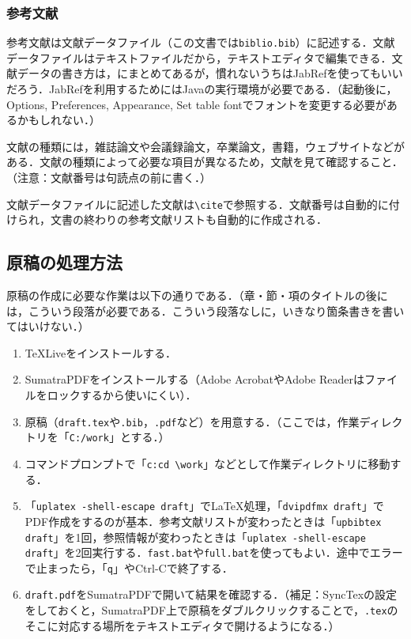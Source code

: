 \documentclass[uplatex,twocolumn,dvipdfmx]{jsarticle}
\begin{document}
\subsubsection{参考文献}\label{参考文献}

参考文献は文献データファイル（この文書では\verb|biblio.bib|）に記述する．文献データファイルはテキストファイルだから，テキストエディタで編集できる．文献データの書き方は，\cite{参考文献リストの書き方}にまとめてあるが，慣れないうちはJabRefを使ってもいいだろう．JabRefを利用するためにはJavaの実行環境が必要である．（起動後に，Options, Preferences, Appearance, Set table fontでフォントを変更する必要があるかもしれない．）

文献の種類には，雑誌論文\cite{yabuki2011}や会議録論文\cite{数式処理システムの性能評価}，卒業論文\cite{kubo2014}，書籍\cite{okumura2017}，ウェブサイト\cite{文章チェックリスト}などがある．文献の種類によって必要な項目が異なるため，文献\cite{参考文献リストの書き方}を見て確認すること．（注意：文献番号は句読点の前に書く．）

文献データファイルに記述した文献は\verb|\cite|で参照する．文献番号は自動的に付けられ，文書の終わりの参考文献リストも自動的に作成される．

\subsection{原稿の処理方法}

原稿の作成に必要な作業は以下の通りである．（章・節・項のタイトルの後には，こういう段落が必要である．こういう段落なしに，いきなり箇条書きを書いてはいけない．）

\begin{enumerate}
\item TeXLiveをインストールする．
\item SumatraPDFをインストールする（Adobe AcrobatやAdobe Readerはファイルをロックするから使いにくい）．
\item 原稿（\verb|draft.tex|や\verb|.bib|，\verb|.pdf|など）を用意する．（ここでは，作業ディレクトリを「\verb|C:/work|」とする．）
\item コマンドプロンプトで「\verb|c:|\verb|cd \work|」などとして作業ディレクトリに移動する．
\item 「\verb|uplatex -shell-escape draft|」で\LaTeX 処理，「\verb|dvipdfmx draft|」でPDF作成をするのが基本．参考文献リストが変わったときは「\verb|upbibtex draft|」を1回，参照情報が変わったときは「\verb|uplatex -shell-escape draft|」を2回実行する．\verb|fast.bat|や\verb|full.bat|を使ってもよい．途中でエラーで止まったら，「\verb|q|」やCtrl-Cで終了する．
\item \verb|draft.pdf|をSumatraPDFで開いて結果を確認する．（補足：SyncTexの設定をしておくと，SumatraPDF上で原稿をダブルクリックすることで，\verb|.tex|のそこに対応する場所をテキストエディタで開けるようになる．）
\end{enumerate}
\end{document}
